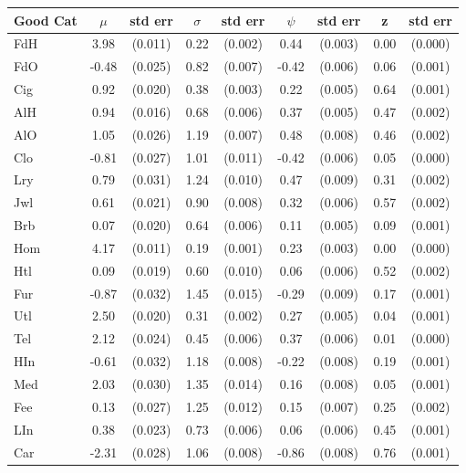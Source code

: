 \documentclass[11pt]{article}
\begin{document}
\begin{CJK}{UTF8}{gbsn}
\begin{table}[!ht]
    \centering
    \begin{tabular}{lcccccccc}
        \hline\hline
        Good Cat & $\mu$ & std err & $\sigma$ & std err & $\psi$ & std err & z & std err\\
        \hline 
        FdH &  3.98 &  (0.011) & 0.22 & (0.002) &  0.44 & (0.003) & 0.00 & (0.000)\\ 
        FdO & -0.48 &  (0.025) & 0.82 & (0.007) & -0.42 & (0.006) & 0.06 & (0.001)\\ 
        Cig &  0.92 &  (0.020) & 0.38 & (0.003) &  0.22 & (0.005) & 0.64 & (0.001)\\ 
        AlH &  0.94 &  (0.016) & 0.68 & (0.006) &  0.37 & (0.005) & 0.47 & (0.002)\\ 
        AlO &  1.05 &  (0.026) & 1.19 & (0.007) &  0.48 & (0.008) & 0.46 & (0.002)\\ 
        Clo & -0.81 &  (0.027) & 1.01 & (0.011) & -0.42 & (0.006) & 0.05 & (0.000)\\ 
        Lry &  0.79 &  (0.031) & 1.24 & (0.010) &  0.47 & (0.009) & 0.31 & (0.002)\\ 
        Jwl &  0.61 &  (0.021) & 0.90 & (0.008) &  0.32 & (0.006) & 0.57 & (0.002)\\ 
        Brb &  0.07 &  (0.020) & 0.64 & (0.006) &  0.11 & (0.005) & 0.09 & (0.001)\\ 
        Hom &  4.17 &  (0.011) & 0.19 & (0.001) &  0.23 & (0.003) & 0.00 & (0.000)\\ 
        Htl &  0.09 &  (0.019) & 0.60 & (0.010) &  0.06 & (0.006) & 0.52 & (0.002)\\ 
        Fur & -0.87 &  (0.032) & 1.45 & (0.015) & -0.29 & (0.009) & 0.17 & (0.001)\\ 
        Utl &  2.50 &  (0.020) & 0.31 & (0.002) &  0.27 & (0.005) & 0.04 & (0.001)\\ 
        Tel &  2.12 &  (0.024) & 0.45 & (0.006) &  0.37 & (0.006) & 0.01 & (0.000)\\ 
        HIn & -0.61 &  (0.032) & 1.18 & (0.008) & -0.22 & (0.008) & 0.19 & (0.001)\\ 
        Med &  2.03 &  (0.030) & 1.35 & (0.014) &  0.16 & (0.008) & 0.05 & (0.001)\\ 
        Fee &  0.13 &  (0.027) & 1.25 & (0.012) &  0.15 & (0.007) & 0.25 & (0.002)\\ 
        LIn &  0.38 &  (0.023) & 0.73 & (0.006) &  0.06 & (0.006) & 0.45 & (0.001)\\ 
        Car & -2.31 &  (0.028) & 1.06 & (0.008) & -0.86 & (0.008) & 0.76 & (0.001)\\ 

\end{tabular}
\end{table}
\end{CJK}
\end{document}
